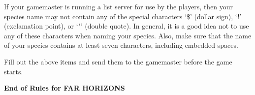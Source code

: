 \documentclass[10pt,titlepage]{article}
\begin{document}
\begin{importantnote}
	If your gamemaster is running a list server for use
	by the players, then your species name may not contain any of
	the special characters `\$' (dollar sign), `!' (exclamation
	point), or `"' (double quote).  In general, it is a good idea
	not to use any of these characters when naming your species.
	Also, make sure that the name of your species contains at
	least seven characters, including embedded spaces.
\end{importantnote}

\noindent Fill out the above items and send them to the gamemaster before the game
starts.


\begin{center}
\textbf{End of Rules for FAR HORIZONS}
\end{center} 
\end{document}
